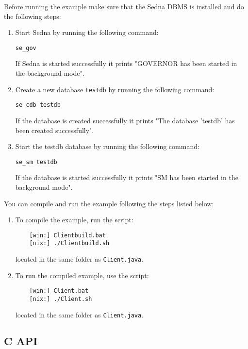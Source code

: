 \documentclass[a4paper,12pt]{article}
\begin{document}
Before running the example make sure that the Sedna DBMS is installed and do the
following steps:

\begin{enumerate}
\item Start Sedna by running the following command:
\begin{verbatim}
se_gov
\end{verbatim}
If Sedna is started successfully it prints "GOVERNOR has been started in
the background mode".
\item Create a new database \verb!testdb! by running the following command:
\begin{verbatim}
se_cdb testdb
\end{verbatim}
If the database is created successfully it prints "The database 'testdb' has
been created successfully".
\item Start the testdb database by running the following command:
\begin{verbatim}
se_sm testdb
\end{verbatim}
If the database is started successfully it prints "SM has been started in
the background mode".
\end{enumerate}

You can compile and run the example following the steps listed below:

\begin{enumerate}
\item To compile the example, run the script:
\begin{verbatim}
    [win:] Clientbuild.bat
    [nix:] ./Clientbuild.sh
\end{verbatim}
located in the same folder as \verb!Client.java!.

\item  To run the compiled example, use the script:
\begin{verbatim}
    [win:] Client.bat
    [nix:] ./Client.sh
\end{verbatim}
located in the same folder as \verb!Client.java!.
\end{enumerate}


\subsection{C API}
\label{c-api}
\end{document}
